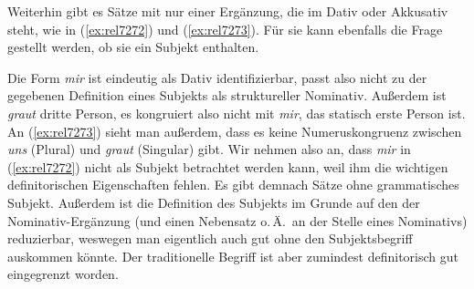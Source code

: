 Weiterhin gibt es Sätze mit nur einer Ergänzung, die im Dativ oder Akkusativ steht, wie in (\ref{ex:rel7272}) und (\ref{ex:rel7273}).
Für sie kann ebenfalls die Frage gestellt werden, ob sie ein Subjekt enthalten.

\begin{exe}
\end{exe}

Die Form \textit{mir} ist eindeutig als Dativ identifizierbar, passt also nicht zu der gegebenen Definition eines Subjekts als struktureller Nominativ.
Außerdem ist \textit{graut} dritte Person, es kongruiert also nicht mit \textit{mir}, das statisch erste Person ist.
An (\ref{ex:rel7273}) sieht man außerdem, dass es keine Numeruskongruenz zwischen \textit{uns} (Plural) und 
\textit{graut} (Singular) gibt.
Wir nehmen also an, dass \textit{mir} in (\ref{ex:rel7272}) nicht als Subjekt betrachtet werden kann, weil ihm die wichtigen definitorischen Eigenschaften fehlen.
Es gibt demnach Sätze ohne grammatisches Subjekt.
Außerdem ist die Definition des Subjekts im Grunde auf den der Nominativ-Ergänzung (und einen Nebensatz o.\,Ä.\ an der Stelle eines Nominativs) reduzierbar, weswegen man eigentlich auch gut ohne den Subjektsbegriff auskommen könnte.
Der traditionelle Begriff ist aber zumindest definitorisch gut eingegrenzt worden.

